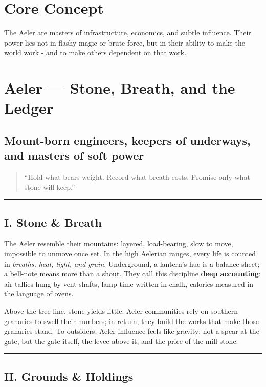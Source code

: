 \documentclass[11pt]{article}
\begin{document}
\section*{Core Concept}
The Aeler are masters of infrastructure, economics, and subtle influence. Their power lies not in flashy magic or brute force, but in their ability to make the world work - and to make others dependent on that work.

\section{Aeler --- Stone, Breath, and the Ledger}

\subsection*{Mount-born engineers, keepers of underways, and masters of soft power}

\begin{quote}
``Hold what bears weight. Record what breath costs. Promise only what stone will keep.''
\end{quote}

\medskip\hrule\medskip

\subsection{I. Stone \& Breath}

The Aeler resemble their mountains: layered, load-bearing, slow to move, impossible to unmove once set. In the high Aelerian ranges, every life is counted in \emph{breaths, heat, light, and grain}. Underground, a lantern's hue is a balance sheet; a bell-note means more than a shout. They call this discipline \textbf{deep accounting}: air tallies hung by vent-shafts, lamp-time written in chalk, calories measured in the language of ovens.

Above the tree line, stone yields little. Aeler communities rely on southern granaries to swell their numbers; in return, they build the works that make those granaries stand. To outsiders, Aeler influence feels like gravity: not a spear at the gate, but the gate itself, the levee above it, and the price of the mill-stone.

\medskip\hrule\medskip

\subsection{II. Grounds \& Holdings}
\end{document}
